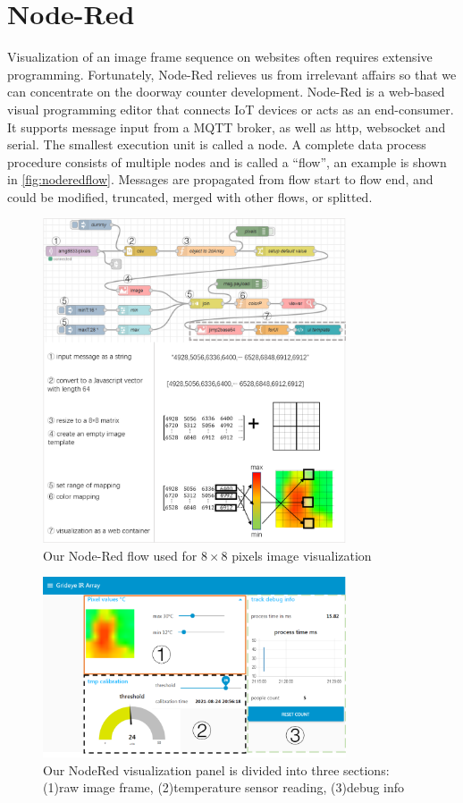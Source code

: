 \section{Node-Red}
Visualization of an image frame sequence on websites often requires extensive programming. Fortunately, Node-Red \cite{nodered} relieves us from irrelevant affairs so that we can concentrate on the doorway counter development. Node-Red is a web-based visual programming editor that connects IoT devices or acts as an end-consumer. It supports message input from a MQTT broker, as well as http, websocket and serial. The smallest execution unit is called a node. A complete data process procedure consists of multiple nodes and is called a ``flow'', an example is shown in \autoref{fig:noderedflow}. Messages are propagated from flow start to flow end, and could be modified, truncated, merged with other flows, or splitted.
\begin{figure}
  \centering
  \includegraphics[width=0.8\textwidth]{figures/noderedflow.PNG}
  \caption{Our Node-Red flow used for $8\times8$ pixels image visualization}\label{fig:noderedflow}
\end{figure}
\begin{figure}
  \centering
  \includegraphics[width=0.8\textwidth]{figures/noderedui.png}
  \caption{Our NodeRed visualization panel is divided into three sections: (1)raw image frame, (2)temperature sensor reading, (3)debug info}\label{fig:noderedui}
\end{figure}

